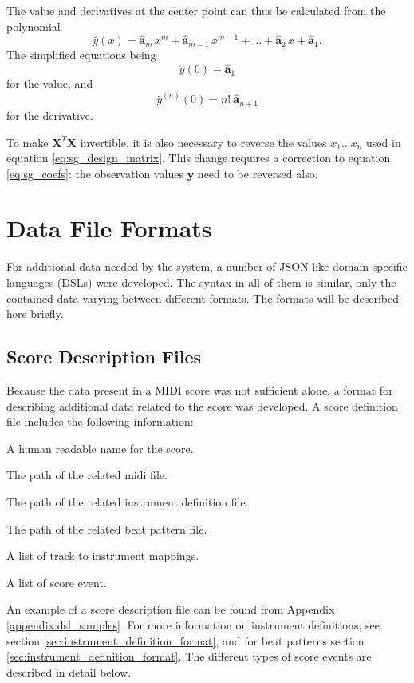The value and derivatives at the center point
can thus be calculated from the polynomial
\begin{equation}
\widehat{y}(x) =
\widehat{\mathbf{a}}_m \, x^m +
\widehat{\mathbf{a}}_{m-1} \, x^{m-1} +
\ldots +
\widehat{\mathbf{a}}_{2} \, x +
\widehat{\mathbf{a}}_{1}.
\end{equation}
The simplified equations being
\begin{equation}
\widehat{y}(0) = \widehat{\mathbf{a}}_{1}
\end{equation}
for the value, and
\begin{equation}
\widehat{y}^{(n)}(0) = n! \: \widehat{\mathbf{a}}_{n + 1}
\end{equation}
for the \nth derivative.

To make $\mathbf{X}^T \mathbf{X}$ invertible,
it is also necessary to reverse the values $x_1 \ldots x_n$
used in equation \ref{eq:sg_design_matrix}.
This change requires a correction to equation \ref{eq:sg_coefs}:
the observation values $\mathbf{y}$ need to be reversed also.

\section{Data File Formats}
\label{sec:data_file_formats}

For additional data needed by the system,
a number of JSON-like \cite{JSON}
domain specific languages (DSLs) were developed.
The syntax in all of them is similar,
only the contained data varying between different formats.
The formats will be described here briefly.

\subsection{Score Description Files}
\label{sec:score_description_file}

Because the data present in a MIDI score was
not sufficient alone, a format
for describing additional data related to the score was developed.
A score definition file includes the following information:
\begin{description}[leftmargin=24ex]
\item[Name] A human readable name for the score.
\item[MIDI file] The path of the related midi file.
\item[Instrument file] The path of the related instrument definition file.
\item[Beat pattern file] The path of the related beat pattern file.
\item[Track information] A list of track to instrument mappings.
\item[Score events] A list of score event.
\end{description}
An example of a score description file can be found from Appendix \ref{appendix:dsl_samples}.
For more information on instrument definitions,
see section \ref{sec:instrument_definition_format},
and for beat patterns section \ref{sec:instrument_definition_format}.
The different types of score events are described in detail below.

